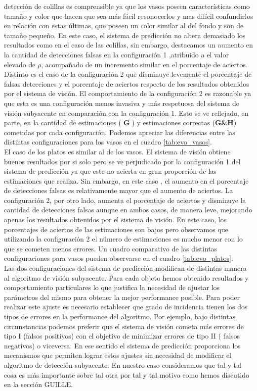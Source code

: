 detección de colillas es comprensible ya que los vasos poseen 
características como tamaño y color que hacen que sea más fácil 
reconocerlos y mas difícil confundirlos en relación con estas 
últimas, que poseen un color similar al del fondo y son de tamaño 
pequeño. En este caso, el sistema de predicción no altera demasiado 
los resultados como en el caso de las colillas, sin embargo, destacamos un 
aumento en la cantidad de detecciones falsas en la configuración 1 
,atribuido a el valor elevado de $\rho$, acompañado de un incremento 
similar en el porcentaje de aciertos. Distinto es el caso de 
la configuración 2 que disminuye levemente el porcentaje de falsas 
detecciones y el porcentaje de aciertos respecto de los resultados
obtenidos por el sistema de visión. El comportamiento de la 
configuración 2 es razonable ya que esta es una configuración menos 
invasiva y más respetuosa del sistema de visión subyacente en 
comparación con la configuración 1. Esto se ve reflejado, en parte, 
en la cantidad de estimaciones ( \textbf{G} ) y estimaciones correctas 
(\textbf{G\&H}) cometidas por cada configuración. Podemos 
apreciar las diferencias entre las distintas configuraciones para los 
vasos en el cuadro \ref{tab:evo_vasos}.\\
\indent El caso de los platos es similar al de los vasos. El sistema de visión 
obtiene buenos resultados por si solo pero se ve perjudicado por la configuración 1 del sistema de 
predicción ya que este no acierta en gran proporción de las estimaciones que realiza. 
Sin embargo, en este caso , el aumento en el porcentaje de detecciones 
falsas es relativamente mayor que el aumento de aciertos. 
La configuración 2, por otro lado, aumenta el 
porcentaje de aciertos y disminuye la cantidad de detecciones falsas 
aunque en ambos casos, de manera leve, mejorando apenas los resultados 
obtenidos por el sistema de visión. En este caso, los porcentajes de 
aciertos de las estimaciones son bajos pero observamos que utilizando 
la configuración 2 el número de estimaciones es mucho menor con lo 
que se cometen menos errores. Un cuadro comparativo de las 
distintas configuraciones para vasos pueden observarse en el cuadro 
\ref{tab:evo_platos}.\\
\indent  Las dos configuraciones del sistema de predicción modifican de 
distintas manera al algoritmo de visión subyacente. Para cada objeto 
hemos obtenido resultados y comportamiento particulares lo que 
justifica la necesidad de ajustar los parámetros del mismo para obtener la mejor 
performance posible. Para poder realizar este ajuste es necesario 
establecer que grado de incidencia tienen los dos tipos de errores en la performance del
algoritmo. Por ejemplo, bajo distintas circunstancias podemos preferir que el  
sistema de visión cometa más errores de tipo I (falsos positivos) con 
el objetivo de minimizar errores de tipo II ( falsos negativos) o 
viceversa. En ese sentido el sistema de predicción proporciona los mecanismos que 
permiten lograr estos ajustes sin necesidad de modificar el algoritmo de detección 
subyacente. En nuestro caso consideramos que tal y tal cosa es más 
importante sobre tal otra por tal y tal motivo como hemos discutido en 
la sección GUILLE.
 

